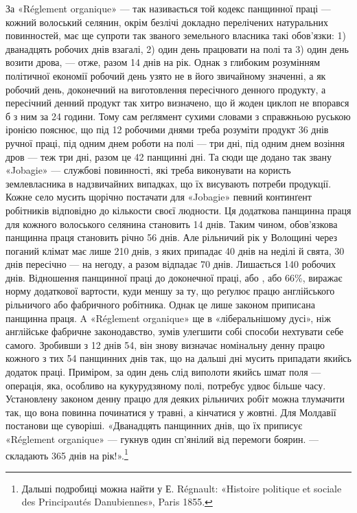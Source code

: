 За «Réglement organique» — так називається той кодекс панщинної
праці — кожний волоський селянин, окрім безлічі докладно
перелічених натуральних повинностей, має ще супроти так
званого земельного власника такі обов’язки: 1) дванадцять робочих
днів взагалі, 2) один день працювати на полі та 3) один день
возити дрова, — отже, разом 14 днів на рік. Однак з глибоким розумінням
політичної економії робочий день узято не в його звичайному
значенні, а як робочий день, доконечний на виготовлення
пересічного денного продукту, а пересічний денний продукт так
хитро визначено, що й жоден циклоп не впорався б з ним за
24 години. Тому сам реґлямент сухими словами з справжньою
руською іронією пояснює, що під 12 робочими днями треба розуміти
продукт 36 днів ручної праці, під одним днем роботи на полі —
три дні, під одним днем возіння дров — теж три дні, разом це
42 панщинні дні. Та сюди ще додано так звану «Jobagie» — службові
повинності, які треба виконувати на користь землевласника
в надзвичайних випадках, що їх висувають потреби продукції.
Кожне село мусить щорічно постачати для «Jobagie» певний
континґент робітників відповідно до кількости своєї людности.
Ця додаткова панщинна праця для кожного волоського селянина
становить 14 днів. Таким чином, обов’язкова панщинна праця
становить річно 56 днів. Але рільничий рік у Волощині через
поганий клімат має лише 210 днів, з яких припадає 40 днів на
неділі й свята, 30 днів пересічно — на негоду, а разом відпадає
70 днів. Лишається 140 робочих днів. Відношення панщинної
праці до доконечної праці, або , або 66\%, виражає норму додаткової
вартости, куди меншу за ту, що реґулює працю англійського
рільничого або фабричного робітника. Однак це лише
законом приписана панщинна праця. A «Réglement organique»
ще в «ліберальнішому дусі», ніж англійське фабричне законодавство,
зумів улегшити собі способи нехтувати себе самого.
Зробивши з 12 днів 54, він знову визначає номінальну денну працю
кожного з тих 54 панщинних днів так, що на дальші дні мусить
припадати якийсь додаток праці. Приміром, за один день слід
виполоти якийсь шмат поля — операція, яка, особливо на кукурудзяному
полі, потребує удвоє більше часу. Установлену законом
денну працю для деяких рільничих робіт можна тлумачити
так, що вона повинна починатися у травні, а кінчатися у жовтні.
Для Молдавії постанови ще суворіші. «Дванадцять панщинних
днів, що їх приписує «Réglement organique» — гукнув один
сп’янілий від перемоги боярин. — складають 365 днів на рік!».\footnote{
Дальші подробиці можна найти у Е. Régnault: «Histoire politique
et sociale des Principautés Danubiennes», Paris 1855.
}

